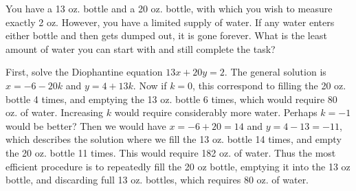 \begin{questions}
  
  	\begin{answer}
  	\end{answer}
  	
  	
  	


\question You have a 13 oz. bottle and a 20 oz. bottle, with which you wish to measure exactly 2 oz.  However, you have a limited supply of water.  If any water enters either bottle and then gets dumped out, it is gone forever.  What is the least amount of water you can start with and still complete the task?

	\begin{answer}
		First, solve the Diophantine equation $13x + 20 y = 2$.  The general solution is $x = -6 - 20k$ and $y = 4+13k$.  Now if $k = 0$, this correspond to filling the 20 oz. bottle 4 times, and emptying the 13 oz. bottle 6 times, which would require 80 oz. of water.  Increasing $k$ would require considerably more water.  Perhaps $k = -1$ would be better?  Then we would have $x = -6+20 = 14$ and $y = 4-13 = -11$, which describes the solution where we fill the 13 oz. bottle 14 times, and empty the 20 oz. bottle 11 times.  This would require 182 oz. of water.  Thus the most efficient procedure is to repeatedly fill the 20 oz bottle, emptying it into the 13 oz bottle, and discarding full 13 oz. bottles, which requires 80 oz. of water.
	\end{answer}
	
	
	
 
\end{questions}



